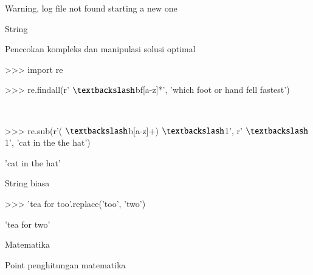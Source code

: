 \documentclass[a4paper,12pt]{report}
\begin{document}
\noindent 
{\fontsize{14pt}{14pt}\selectfont Warning, log file not found starting a new one \\} \par
\vspace{14pt}
\noindent 
{\fontsize{14pt}{14pt}\selectfont String \\} \par
\noindent 
{\fontsize{14pt}{14pt}\selectfont Penccokan kompleks dan manipulasi solusi optimal \\} \par
\vspace{14pt}
\noindent 
{\fontsize{14pt}{14pt}\selectfont >>> import re \\} \par
\vspace{14pt}
\noindent 
{\fontsize{14pt}{14pt}\selectfont >>> re.findall(r' $  \textbackslash  $bf[a-z]*', 'which foot or hand fell fastest') \\} \par
\noindent 
{\fontsize{14pt}{14pt} \\} \par
\vspace{14pt}
\noindent 
{\fontsize{14pt}{14pt}\selectfont >>> re.sub(r'( $  \textbackslash  $b[a-z]+)  $  \textbackslash  $1', r' $  \textbackslash  $1', 'cat in the the hat') \\} \par
\noindent 
{\fontsize{14pt}{14pt}\selectfont 'cat in the hat' \\} \par
\vspace{14pt}
\noindent 
{\fontsize{14pt}{14pt}\selectfont String biasa \\} \par
\noindent 
{\fontsize{14pt}{14pt}\selectfont >>> 'tea for too'.replace('too', 'two') \\} \par
\noindent 
{\fontsize{14pt}{14pt}\selectfont 'tea for two' \\} \par
\vspace{14pt}
\noindent 
{\fontsize{14pt}{14pt}\selectfont Matematika  \\} \par
\noindent 
{\fontsize{14pt}{14pt}\selectfont Point penghitungan matematika \\} \par
\vspace{14pt}
\noindent 
\end{document}
